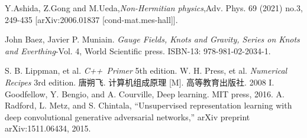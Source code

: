 \begin{thebibliography}{99}
Y.Ashida, Z.Gong and M.Ueda,\textsl{Non-Hermitian physics},Adv. Phys. 69 (2021) no.3, 249-435 [arXiv:2006.01837 [cond-mat.mes-hall]].

John Baez, Javier P. Muniain. \textsl{Gauge Fields, Knots and Gravity, Series on Knots and Everthing}-Vol. 4, World Scientific press. ISBN-13: 978-981-02-2034-1. 

S. B. Lippman, et al. \textsl{C++ Primer} 5th edition. 
W. H. Press, et al. \textsl{Numerical Recipes} 3rd edition. 
唐朔飞. 计算机组成原理 [M]. 高等教育出版社. 2008
I. Goodfellow, Y. Bengio, and A. Courville, Deep learning. MIT press, 2016.
A. Radford, L. Metz, and S. Chintala, “Unsupervised representation learning with deep convolutional generative adversarial networks,” arXiv preprint arXiv:1511.06434, 2015.

\end{thebibliography}
